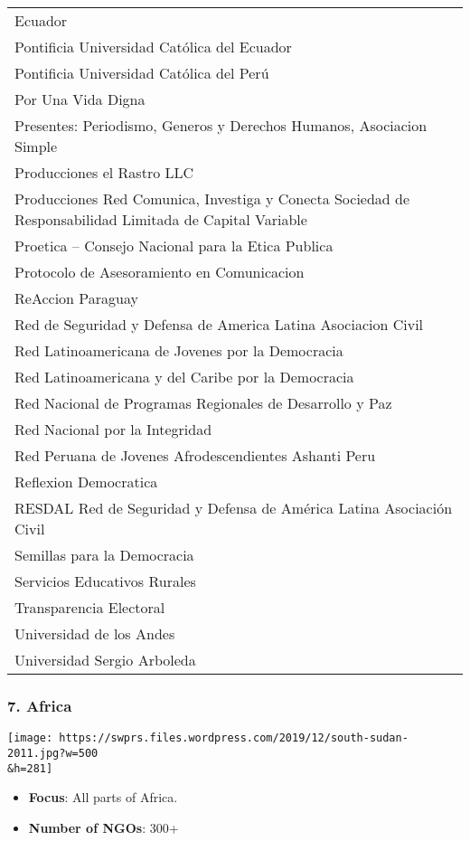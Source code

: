 \begin{longtable}[]{@{}l@{}}
Ecuador\tabularnewline
Pontificia Universidad Católica del Ecuador\tabularnewline
Pontificia Universidad Católica del Perú\tabularnewline
Por Una Vida Digna\tabularnewline
Presentes: Periodismo, Generos y Derechos Humanos, Asociacion
Simple\tabularnewline
Producciones el Rastro LLC\tabularnewline
Producciones Red Comunica, Investiga y Conecta Sociedad de
Responsabilidad Limitada de Capital Variable\tabularnewline
Proetica -- Consejo Nacional para la Etica Publica\tabularnewline
Protocolo de Asesoramiento en Comunicacion\tabularnewline
ReAccion Paraguay\tabularnewline
Red de Seguridad y Defensa de America Latina Asociacion
Civil\tabularnewline
Red Latinoamericana de Jovenes por la Democracia\tabularnewline
Red Latinoamericana y del Caribe por la Democracia\tabularnewline
Red Nacional de Programas Regionales de Desarrollo y Paz\tabularnewline
Red Nacional por la Integridad\tabularnewline
Red Peruana de Jovenes Afrodescendientes Ashanti Peru\tabularnewline
Reflexion Democratica\tabularnewline
RESDAL Red de Seguridad y Defensa de América Latina Asociación
Civil\tabularnewline
Semillas para la Democracia\tabularnewline
Servicios Educativos Rurales\tabularnewline
Transparencia Electoral\tabularnewline
Universidad de los Andes\tabularnewline
Universidad Sergio Arboleda\tabularnewline
\bottomrule
\end{longtable}

\hypertarget{7-africa}{%
\subsubsection{7. Africa}\label{7-africa}}

\texttt{[image: https://swprs.files.wordpress.com/2019/12/south-sudan-2011.jpg?w=500\\\&h=281]}

\begin{itemize}
\tightlist
\item
  \textbf{Focus}: All parts of Africa.
\item
  \textbf{Number of NGOs}: 300+
\end{itemize}

